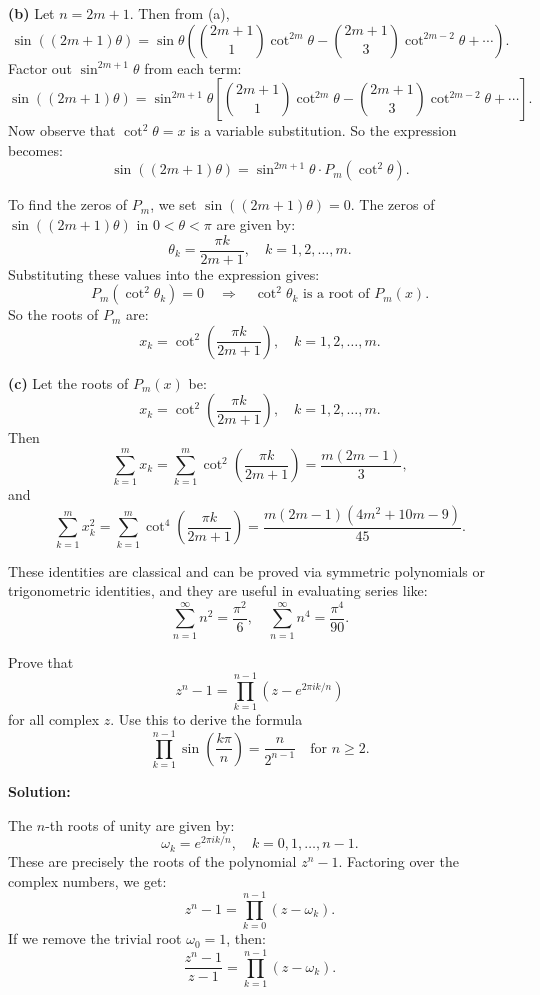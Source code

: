 \textbf{(b)} Let \( n = 2m+1 \). Then from (a),
\[
\sin((2m+1)\theta) = \sin \theta \left( \binom{2m+1}{1} \cot^{2m} \theta - \binom{2m+1}{3} \cot^{2m-2} \theta + \cdots \right).
\]
Factor out \( \sin^{2m+1} \theta \) from each term:
\[
\sin((2m+1)\theta) = \sin^{2m+1} \theta \left[ \binom{2m+1}{1} \cot^{2m} \theta - \binom{2m+1}{3} \cot^{2m-2} \theta + \cdots \right].
\]
Now observe that \( \cot^2 \theta = x \) is a variable substitution. So the expression becomes:
\[
\sin((2m+1)\theta) = \sin^{2m+1} \theta \cdot P_m(\cot^2 \theta).
\]

To find the zeros of \( P_m \), we set \( \sin((2m+1)\theta) = 0 \). The zeros of \( \sin((2m+1)\theta) \) in \( 0 < \theta < \pi \) are given by:
\[
\theta_k = \frac{\pi k}{2m+1}, \quad k = 1, 2, \dots, m.
\]
Substituting these values into the expression gives:
\[
P_m(\cot^2 \theta_k) = 0 \quad \Rightarrow \quad \cot^2 \theta_k \text{ is a root of } P_m(x).
\]
So the roots of \( P_m \) are:
\[
x_k = \cot^2 \left( \frac{\pi k}{2m+1} \right), \quad k = 1, 2, \dots, m.
\]

\textbf{(c)} Let the roots of \( P_m(x) \) be:
\[
x_k = \cot^2 \left( \frac{\pi k}{2m+1} \right), \quad k = 1, 2, \dots, m.
\]
Then
\[
\sum_{k=1}^m x_k = \sum_{k=1}^m \cot^2 \left( \frac{\pi k}{2m+1} \right) = \frac{m(2m-1)}{3},
\]
and
\[
\sum_{k=1}^m x_k^2 = \sum_{k=1}^m \cot^4 \left( \frac{\pi k}{2m+1} \right) = \frac{m(2m-1)(4m^2 + 10m - 9)}{45}.
\]

These identities are classical and can be proved via symmetric polynomials or trigonometric identities, and they are useful in evaluating series like:
\[
\sum_{n=1}^\infty n^2 = \frac{\pi^2}{6}, \quad \sum_{n=1}^\infty n^4 = \frac{\pi^4}{90}.
\]

\begin{problembox}
Prove that
\[
z^n - 1 = \prod_{k=1}^{n-1} \left(z - e^{2\pi i k/n}\right)
\]
for all complex \( z \). Use this to derive the formula
\[
\prod_{k=1}^{n-1} \sin \left( \frac{k\pi}{n} \right) = \frac{n}{2^{n-1}} \quad \text{for } n \geq 2.
\]
\end{problembox}

\textbf{Solution:}

The \( n \)-th roots of unity are given by:
\[
\omega_k = e^{2\pi i k/n}, \quad k = 0, 1, \dots, n-1.
\]
These are precisely the roots of the polynomial \( z^n - 1 \). Factoring over the complex numbers, we get:
\[
z^n - 1 = \prod_{k=0}^{n-1} (z - \omega_k).
\]
If we remove the trivial root \( \omega_0 = 1 \), then:
\[
\frac{z^n - 1}{z - 1} = \prod_{k=1}^{n-1} (z - \omega_k).
\]

